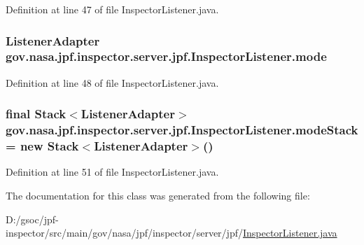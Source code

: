 Definition at line 47 of file Inspector\+Listener.\+java.

\subsubsection[{\texorpdfstring{mode}{mode}}]{\setlength{\rightskip}{0pt plus 5cm}Listener\+Adapter gov.\+nasa.\+jpf.\+inspector.\+server.\+jpf.\+Inspector\+Listener.\+mode\hspace{0.3cm}{\ttfamily [private]}}\hypertarget{classgov_1_1nasa_1_1jpf_1_1inspector_1_1server_1_1jpf_1_1_inspector_listener_a666ea4f9fb4e868903700b0a0523a992}{}\label{classgov_1_1nasa_1_1jpf_1_1inspector_1_1server_1_1jpf_1_1_inspector_listener_a666ea4f9fb4e868903700b0a0523a992}


Definition at line 48 of file Inspector\+Listener.\+java.

\subsubsection[{\texorpdfstring{mode\+Stack}{modeStack}}]{\setlength{\rightskip}{0pt plus 5cm}final Stack$<$Listener\+Adapter$>$ gov.\+nasa.\+jpf.\+inspector.\+server.\+jpf.\+Inspector\+Listener.\+mode\+Stack = new Stack$<$Listener\+Adapter$>$()\hspace{0.3cm}{\ttfamily [private]}}\hypertarget{classgov_1_1nasa_1_1jpf_1_1inspector_1_1server_1_1jpf_1_1_inspector_listener_a0b6bfce4730f04507fef5bd418a96a4c}{}\label{classgov_1_1nasa_1_1jpf_1_1inspector_1_1server_1_1jpf_1_1_inspector_listener_a0b6bfce4730f04507fef5bd418a96a4c}


Definition at line 51 of file Inspector\+Listener.\+java.



The documentation for this class was generated from the following file\+:\begin{DoxyCompactItemize}
\item 
D\+:/gsoc/jpf-\/inspector/src/main/gov/nasa/jpf/inspector/server/jpf/\hyperlink{_inspector_listener_8java}{Inspector\+Listener.\+java}\end{DoxyCompactItemize}
